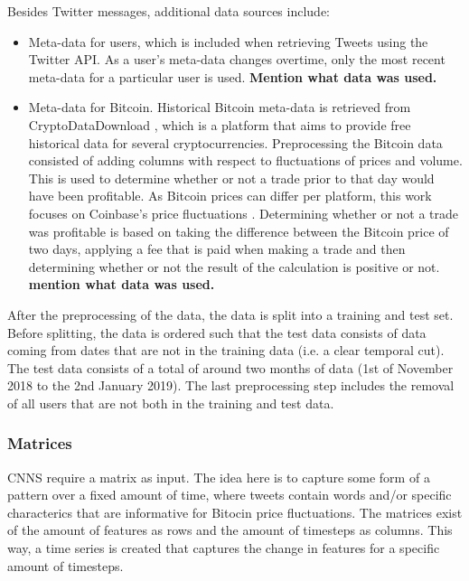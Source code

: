 \documentclass{article}
\begin{document}
Besides Twitter messages, additional data sources include:
\begin{itemize}
    \item Meta-data for users, which is included when retrieving Tweets using the Twitter API. As a user's meta-data changes overtime, only the most recent meta-data for a particular user is used. \textbf{Mention what data was used.}
    \item Meta-data for Bitcoin. Historical Bitcoin meta-data is retrieved from CryptoDataDownload \cite{cryptodatadownload}, which is a platform that aims to provide free historical data for several cryptocurrencies. Preprocessing the Bitcoin data consisted of adding columns with respect to fluctuations of prices and volume. This is used to determine whether or not a trade prior to that day would have been profitable. As Bitcoin prices can differ per platform, this work focuses on Coinbase's price fluctuations \cite{coinbase_pro}. Determining whether or not a trade was profitable is based on taking the difference between the Bitcoin price of two days, applying a fee that is paid when making a trade and then determining whether or not the result of the calculation is positive or not. \textbf{mention what data was used.}
\end{itemize}
After the preprocessing of the data, the data is split into a training and test set. Before splitting, the data is ordered such that the test data consists of data coming from dates that are not in the training data (i.e. a clear temporal cut). The test data consists of a total of around two months of data (1st of November 2018 to the 2nd January 2019). The last preprocessing step includes the removal of all users that are not both in the training and test data. 

\subsubsection{Matrices}
CNNS require a matrix as input. The idea here is to capture some form of a pattern over a fixed amount of time, where tweets contain words and/or specific characterics that are informative for Bitocin price fluctuations. The matrices exist of the amount of features as rows and the amount of timesteps as columns. This way, a time series is created that captures the change in features for a specific amount of timesteps.
\end{document}
